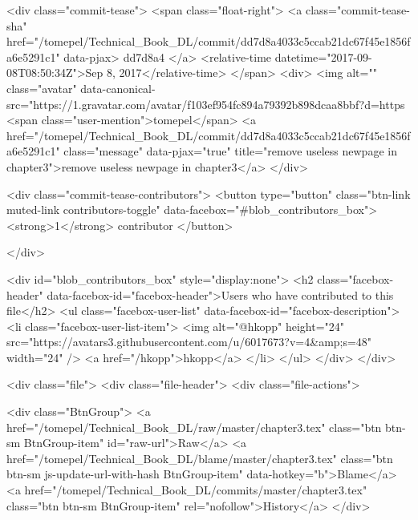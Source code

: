   
  <div class="commit-tease">
      <span class="float-right">
        <a class="commit-tease-sha" href="/tomepel/Technical_Book_DL/commit/dd7d8a4033c5ccab21dc67f45e1856fa6e5291c1" data-pjax>
          dd7d8a4
        </a>
        <relative-time datetime="2017-09-08T08:50:34Z">Sep 8, 2017</relative-time>
      </span>
      <div>
        <img alt="" class="avatar" data-canonical-src="https://1.gravatar.com/avatar/f103ef954fc894a79392b898dcaa8bbf?d=https%
        <span class="user-mention">tomepel</span>
          <a href="/tomepel/Technical_Book_DL/commit/dd7d8a4033c5ccab21dc67f45e1856fa6e5291c1" class="message" data-pjax="true" title="remove useless newpage in chapter3">remove useless newpage in chapter3</a>
      </div>

    <div class="commit-tease-contributors">
      <button type="button" class="btn-link muted-link contributors-toggle" data-facebox="#blob_contributors_box">
        <strong>1</strong>
         contributor
      </button>
      
    </div>

    <div id="blob_contributors_box" style="display:none">
      <h2 class="facebox-header" data-facebox-id="facebox-header">Users who have contributed to this file</h2>
      <ul class="facebox-user-list" data-facebox-id="facebox-description">
          <li class="facebox-user-list-item">
            <img alt="@hkopp" height="24" src="https://avatars3.githubusercontent.com/u/6017673?v=4&amp;s=48" width="24" />
            <a href="/hkopp">hkopp</a>
          </li>
      </ul>
    </div>
  </div>


  <div class="file">
    <div class="file-header">
  <div class="file-actions">

    <div class="BtnGroup">
      <a href="/tomepel/Technical_Book_DL/raw/master/chapter3.tex" class="btn btn-sm BtnGroup-item" id="raw-url">Raw</a>
        <a href="/tomepel/Technical_Book_DL/blame/master/chapter3.tex" class="btn btn-sm js-update-url-with-hash BtnGroup-item" data-hotkey="b">Blame</a>
      <a href="/tomepel/Technical_Book_DL/commits/master/chapter3.tex" class="btn btn-sm BtnGroup-item" rel="nofollow">History</a>
    </div>

